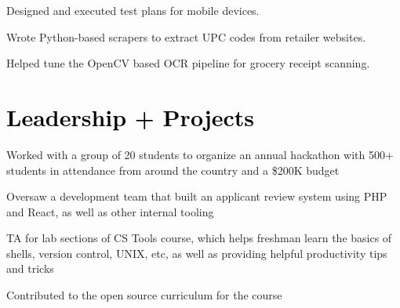 \documentclass[]{resume-openfont}
\begin{document}
\begin{minipage}[t]{0.7\textwidth}

\begin{tightemize}
\item Designed and executed test plans for mobile devices.
\item Wrote Python-based scrapers to extract UPC codes from retailer websites.
\item Helped tune the OpenCV based OCR pipeline for grocery receipt scanning.
\end{tightemize}
\sectionsep

\section{\textcolor{black}{Leadership + Projects}}
\begin{tightemize}
\item Worked with a group of 20 students to organize an annual hackathon with 500+ students in attendance from around the country and a \$200K budget
\item Oversaw a development team that built an applicant review system using PHP and React, as well as other internal tooling
\end{tightemize}
\sectionsep

\begin{tightemize}
\item TA for lab sections of CS Tools course, which helps freshman learn the basics of shells, version control, UNIX, etc, as well as providing helpful  productivity tips and tricks
\item Contributed to the open source curriculum for the course
\end{tightemize}
\sectionsep


\end{minipage}
\end{document}
